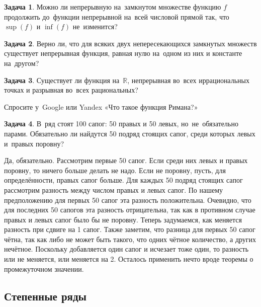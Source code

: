 \documentclass[pdftex, 12pt, a4paper]{article}
\def\R{\ensuremath{\mathbb{R}}} %
\theoremstyle{definition} %
\newtheorem{problem}{Задача}
\numberwithin{problem}{section}
\numberwithin{blits}{section}
\begin{document}
\begin{problem}
Можно ли непрерывную на~замкнутом множестве функцию $f$  продолжить до~функции непрерывной на~всей числовой прямой так, что $\sup(f)$ и $\inf(f)$ не~изменится?
\begin{sol}
\end{sol}
\end{problem}

\begin{problem}
Верно ли, что для всяких двух непересекающихся замкнутых множеств существует непрерывная функция, равная нулю на~одном из них и константе на~другом?
\begin{sol}
\end{sol}
\end{problem}

\begin{problem}
Существует ли функция на~$\R$, непрерывная во~всех иррациональных точках и разрывная во~всех рациональных?
\begin{sol}
Спросите у~Google или Yandex «Что такое функция Римана?»
\end{sol}
\end{problem}

\begin{problem}
В~ряд стоят 100 сапог: 50 правых и 50 левых, но~не~обязательно парами. Обязательно ли найдутся 50 подряд стоящих сапог, среди которых левых и~правых поровну?
\begin{sol}
 Да, обязательно. Рассмотрим первые 50 сапог. Если среди них левых и правых поровну, то ничего больше делать не надо. Если не поровну, пусть, для определённости, правых сапог больше. Для каждых 50 подряд стоящих сапог рассмотрим разность между числом правых и левых сапог. По нашему предположению для первых 50 сапог эта разность положительна. Очевидно, что для последних 50 сапогов эта разность отрицательна, так как в противном случае правых и левых сапог было бы не поровну. Теперь задумаемся, как меняется разность при сдвиге на 1 сапог. Также заметим, что разница для первых 50 сапог чётна, так как либо не может быть такого, что одних чётное количество, а других нечётное. Поскольку добавляется один сапог и исчезает тоже один, то разность или не меняется, или меняется на 2. Осталось применить нечто вроде теоремы о промежуточном значении.
\end{sol}
\end{problem}


\subsection{Степенные ряды}
\end{document}
